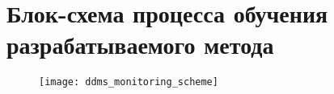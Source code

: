 \chapter{Блок-схема процесса обучения разрабатываемого метода}
\label{app:DDMS:MonitoringScheme}
\begin{figure}[H]
\texttt{[image: ddms\_monitoring\_scheme]}
\end{figure}